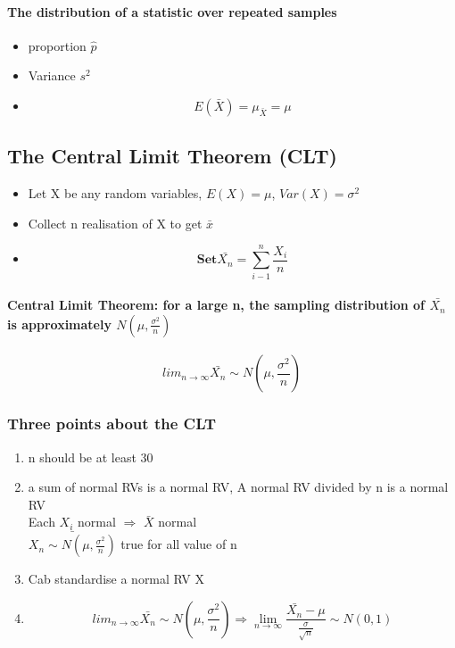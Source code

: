 \documentclass[11pt]{article} %
\begin{document}
\paragraph{The distribution of a statistic over repeated samples}
\begin{itemize}
    \item proportion $\hat{p}$
    \item Variance $s^2$
    \item $$ E(\bar{X})=\mu_{\bar{X}}=\mu $$
\end{itemize}
% 
% 
% 
% 
\subsection{The Central Limit Theorem (CLT)}
\begin{itemize}
    \item Let X be any random variables, $E(X)=\mu$, $Var(X)=\sigma^2$
    \item Collect n realisation of X to get $\bar{x}$
    \item $$ \mathbf{Set } \bar{X_n}=\sum_{i-1}^{n}\frac{X_i}{n} $$
\end{itemize}
% 
% 
% 
% 
\paragraph{\textbf{Central Limit Theorem: }for a large n, the sampling distribution of $\bar{X_n}$ is approximately $N(\mu, \frac{\sigma^2}{n})$}
% 
$$ lim_{n \rightarrow \infty }  \bar{X_n} \sim N(\mu, \frac{\sigma^2}{n})$$
% 
% 
% 
% 
\subsubsection{Three points about the CLT}
\begin{enumerate}
    \item n should be at least 30
    \item a sum of normal RVs is a normal RV, A normal RV divided by n is a normal RV \\
          Each $X_i$ normal $\Rightarrow$ $\bar{X}$ normal \\
          $\bar{X_n \sim N(\mu, \frac{\sigma^2}{n})}$ true for all value of n
    \item Cab standardise a  normal RV X
    \item $$ lim_{n \rightarrow \infty}\bar{X_n} \sim N(\mu,\frac{\sigma^2}{n}) \Rightarrow \lim_{n \rightarrow \infty} \frac{\bar{X_n}-\mu}{\frac{\sigma}{\sqrt{n}}} \sim N(0,1)$$
\end{enumerate}
% 
% 
% 
\end{document}
